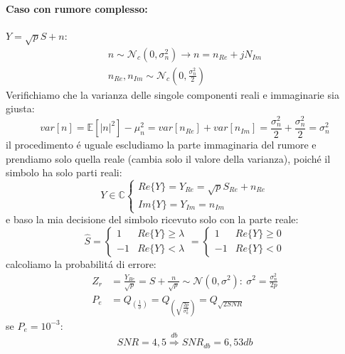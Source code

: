             \paragraph{Caso con rumore complesso:} $Y = \sqrt{p}S + n$:
                \begin{gather}
                    n\sim \mathcal{N}_c(0,\sigma_n^2)\rightarrow n = n_{Re} + jN_{Im} \nonumber \\
                    n_{Re},n_{Im}\sim \mathcal{N}_c(0,\frac{\sigma_n^2}{2})\nonumber
                \end{gather}
                Verifichiamo che la varianza delle singole componenti reali e immaginarie sia giusta:
                \[
                    var[n] = \mathbb{E}[|n|^2]-\mu_n^2 = var[n_{Re}]+ var[n_{Im}] = \frac{\sigma_n^2}{2} + \frac{\sigma_n^2}{2} = \sigma_n^2
                \]
                il procedimento  é uguale escludiamo la parte immaginaria del rumore e prendiamo solo quella reale (cambia solo il valore della varianza),
                poiché il simbolo ha solo parti reali:
                \[
                    Y \in \mathbb{C} 
                    \begin{cases}
                        Re\{Y\} = Y_{Re} = \sqrt{p}S_{Re} + n_{Re}\nonumber \\
                        Im\{Y\} = Y_{Im} = n_{Im}\nonumber    
                    \end{cases}      
                \]      
                e baso la mia decisione del simbolo ricevuto solo con la parte reale:
                \[
                    \hat{S} = 
                    \begin{cases}
                        1 &Re\{Y\} \geq\lambda\nonumber \\    
                        -1 &Re\{Y\} <\lambda\nonumber    
                    \end{cases}  = 
                    \begin{cases}
                        1 &Re\{Y\} \geq0\nonumber \\    
                        -1 &Re\{Y\} <0\nonumber    
                    \end{cases}    
                \]
                calcoliamo la probabilitá di errore:
                \begin{align}
                    Z_r &= \frac{Y_{Re}}{\sqrt{p}} = S+ \frac{n}{\sqrt{p}} \sim \mathcal{N}(0,\sigma^2):\ \sigma^2 = \frac{\sigma^2_n}{2p}\nonumber \\
                    P_e &= Q_{\displaystyle\left(\frac{1}{\sigma}\right)} = Q_{\displaystyle\left(\sqrt{\frac{2p}{\sigma_n^2}}\right)} = Q_{\sqrt{2SNR}}\nonumber
                \end{align}
                se $P_e = 10^{-3}$:
                \[
                    SNR = 4,5\overset{db}{\Rightarrow}{SNR}_{db}=6,53db    
                \]

